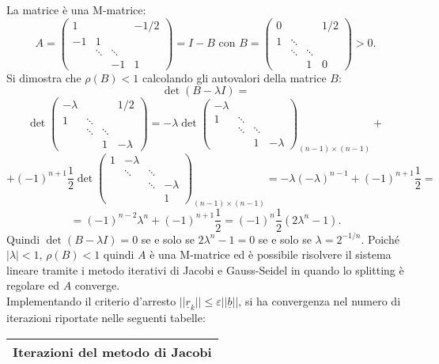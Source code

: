   \begin{sol}
        \normalfont
        La matrice è una M-matrice:$$A=\begin{pmatrix}1&&&-1/2\\-1&1&&\\&\ddots&\ddots&\\&&-1&1\end{pmatrix}=I-B\mbox{ con }B=\begin{pmatrix}0&&&1/2\\1&\ddots&&\\&\ddots&\ddots&\\&&1&0\end{pmatrix}>0.$$
        Si dimostra che $\rho(B)<1$ calcolando gli autovalori della matrice $B$:
        $$\det(B-\lambda I)=$$ $$\det\begin{pmatrix}-\lambda&&&1/2\\1&\ddots&&\\&\ddots&\ddots&\\&&1&-\lambda\end{pmatrix}=-\lambda\det\begin{pmatrix}-\lambda&&&\\1&\ddots&&\\&\ddots&\ddots&\\&&1&-\lambda\end{pmatrix}_{(n-1)\times (n-1)}+$$ $$+(-1)^{n+1}\frac{1}{2}\det\begin{pmatrix}1&-\lambda &&\\&\ddots&\ddots&\\&&\ddots&-\lambda\\&&&1\end{pmatrix}_{(n-1)\times (n-1)} = -\lambda(-\lambda)^{n-1}+(-1)^{n+1}\frac{1}{2}=$$$$=(-1)^{n-2}\lambda^n+(-1)^{n+1}\frac{1}{2}=(-1)^n\frac{1}{2}(2\lambda^n-1).$$
        Quindi $\det(B-\lambda I)=0$ se e solo se $2\lambda^n-1=0$ se e solo se $\lambda=2^{-1/n}$. Poiché
        $|\lambda|<1$, $\rho(B)<1$ quindi $A$ è una M-matrice ed è possibile risolvere il sistema lineare tramite i metodo iterativi
        di Jacobi e Gauss-Seidel in quando lo splitting è regolare ed $A$ converge.\\
        Implementando il criterio d'arresto $||\underline{r}_k||\leq\varepsilon||\underline{b}||$, si ha convergenza nel numero di iterazioni riportate nelle seguenti tabelle:
        \footnotesize
        \begin{center}\begin{tabular}{|c||c|c|c|c|c|c|c|c|c|c|}
        \hline\multicolumn{11}{c}{Iterazioni del metodo di Jacobi}\\\hline

\end{tabular}
\end{center}
\end{sol}
